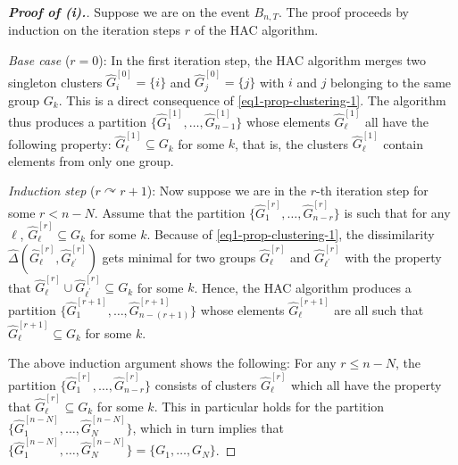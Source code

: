 \begin{proof}[\textnormal{\textbf{Proof of (i).}}]
Suppose we are on the event $B_{n,T}$. The proof proceeds by induction on the iteration steps $r$ of the HAC algorithm. 
\vspace{7pt}

\textit{Base case} ($r=0$): In the first iteration step, the HAC algorithm merges two singleton clusters $\widehat{G}_i^{[0]} = \{ i \}$ and $\widehat{G}_j^{[0]} = \{ j \}$ with $i$ and $j$ belonging to the same group $G_k$. This is a direct consequence of \eqref{eq1-prop-clustering-1}. The algorithm thus produces a partition $\{ \widehat{G}_1^{[1]},\ldots,\widehat{G}_{n-1}^{[1]} \}$ whose elements $\widehat{G}_\ell^{[1]}$ all have the following property: $\widehat{G}_\ell^{[1]} \subseteq G_k$ for some $k$, that is, the clusters $\widehat{G}_\ell^{[1]}$ contain elements from only one group. 
\vspace{7pt}

\textit{Induction step} ($r \curvearrowright r+1$): Now suppose we are in the $r$-th iteration step for some $r < n-N$. Assume that the partition $\{\widehat{G}_1^{[r]},\ldots,\widehat{G}_{n-r}^{[r]}\}$ is such that for any $\ell$, $\widehat{G}_\ell^{[r]} \subseteq G_k$ for some $k$. Because of \eqref{eq1-prop-clustering-1}, the dissimilarity $\widehat{\Delta}(\widehat{G}_\ell^{[r]},\widehat{G}_{\ell^\prime}^{[r]})$ gets minimal for two groups $\widehat{G}_\ell^{[r]}$ and $\widehat{G}_{\ell^\prime}^{[r]}$ with the property that $\widehat{G}_\ell^{[r]} \cup \widehat{G}_{\ell^\prime}^{[r]} \subseteq G_k$ for some $k$. Hence, the HAC algorithm produces a partition $\{ \widehat{G}_1^{[r+1]},\ldots,\widehat{G}_{n-(r+1)}^{[r+1]} \}$ whose elements $\widehat{G}_\ell^{[r+1]}$ are all such that $\widehat{G}_\ell^{[r+1]} \subseteq G_k$ for some $k$. 
\vspace{7pt}

The above induction argument shows the following: For any $r \le n - N$, the partition $\{ \widehat{G}_1^{[r]},\ldots,\widehat{G}_{n-r}^{[r]} \}$ consists of clusters $\widehat{G}_\ell^{[r]}$ which all have the property that $\widehat{G}_\ell^{[r]} \subseteq G_k$ for some $k$. This in particular holds for the partition $\{ \widehat{G}_1^{[n-N]},\ldots,\widehat{G}_N^{[n-N]} \}$, which in turn implies that $\{ \widehat{G}_1^{[n-N]},\ldots,\widehat{G}_N^{[n-N]} \} =\{ G_1,\ldots,G_N \}$.  
\end{proof}


